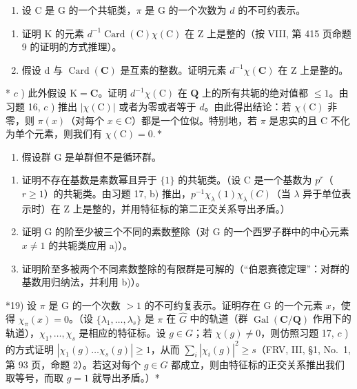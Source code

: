 \begin{enumerate}
\def\labelenumi{\arabic{enumi})}
\setcounter{enumi}{16}
\tightlist
\item
  设 \(\mathrm{C}\) 是 \(\mathrm{G}\) 的一个共轭类，\(\pi\) 是 \(\mathrm{G}\) 的一个次数为 \(d\) 的不可约表示。
\end{enumerate}

\begin{enumerate}
\def\labelenumi{\alph{enumi})}
\item
  证明 K 的元素 \(d^{-1}\operatorname{Card}(\mathrm{C})\chi(\mathrm{C})\) 在 Z 上是整的（按 VIII, 第 415 页命题 9 的证明的方式推理）。
\item
  假设 d 与 \(\operatorname{Card}(\mathbf{C})\) 是互素的整数。证明元素 \(d^{-1}\chi(\mathbf{C})\) 在 Z 上是整的。
\end{enumerate}

* \(c\) ) 此外假设 \(\mathrm{K} = \mathbf{C}\)。证明 \(d^{-1}\chi (\mathrm{C})\) 在 \(\mathbf{Q}\) 上的所有共轭的绝对值都 \(\leqslant 1\)。由习题 16, \(c\) ) 推出 \(|\chi (\mathrm{C})|\) 或者为零或者等于 \(d\)。由此得出结论：若 \(\chi (\mathrm{C})\) 非零，则 \(\pi (x)\)（对每个 \(x\in \mathrm{C}\)）都是一个位似。特别地，若 \(\pi\) 是忠实的且 C 不化为单个元素，则我们有 \(\chi (\mathrm{C}) = 0.\ast\)

\begin{enumerate}
\def\labelenumi{\arabic{enumi})}
\setcounter{enumi}{17}
\tightlist
\item
  假设群 G 是单群但不是循环群。
\end{enumerate}

\begin{enumerate}
\def\labelenumi{\alph{enumi})}
\item
  证明不存在基数是素数幂且异于 \(\{1\}\) 的共轭类。（设 C 是一个基数为 \(p^{r}\)（\(r \geqslant 1\)）的共轭类。由习题 17, b) 推出，\(p^{-1}\chi_{\lambda}(1)\chi_{\lambda}(C)\)（当 \(\lambda\) 异于单位表示时）在 Z 上是整的，并用特征标的第二正交关系导出矛盾。）
\item
  证明 G 的阶至少被三个不同的素数整除（对 G 的一个西罗子群中的中心元素 \(x \neq 1\) 的共轭类应用 a)）。
\item
  证明阶至多被两个不同素数整除的有限群是可解的（“伯恩赛德定理”：对群的基数用归纳法，并利用 b)）。
\end{enumerate}

*19) 设 \(\pi\) 是 G 的一个次数 \(>1\) 的不可约复表示。证明存在 G 的一个元素 \(x\)，使得 \(\chi_{\pi}(x)=0\)。（设 \(\{\lambda_1,\ldots,\lambda_s\}\) 是 \(\pi\) 在 \(\widehat{G}\) 中的轨道（群 \(\operatorname{Gal}(\mathbf{C}/\mathbf{Q})\) 作用下的轨道），\(\chi_1,\ldots,\chi_s\) 是相应的特征标。设 \(g\in G\)；若 \(\chi(g)\neq 0\)，则仿照习题 17, \(c\) ) 的方式证明 \(|\chi_1(g)\ldots\chi_s(g)|\geqslant 1\)，从而 \(\sum_i|\chi_i(g)|^2\geqslant s\)（FRV, III, §1, No.~1, 第 93 页，命题 2）。若这对每个 \(g\in G\) 都成立，则由特征标的正交关系推出我们取等号，而取 \(g=1\) 就导出矛盾。）*

